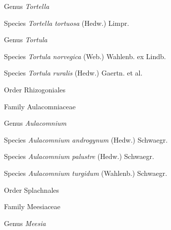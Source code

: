 \documentclass[9pt, article]{memoir}
\begin{document}
\begin{multicols}{2}
\vspace{6pt}\noindent\hspace{30pt}Genus \textit{Tortella}


\vspace{6pt}\noindent\hspace{36pt}Species \textit{Tortella tortuosa} (Hedw.) Limpr.


\vspace{6pt}\noindent\hspace{30pt}Genus \textit{Tortula}


\vspace{6pt}\noindent\hspace{36pt}Species \textit{Tortula norvegica} (Web.) Wahlenb. ex Lindb.


\vspace{6pt}\noindent\hspace{36pt}Species \textit{Tortula ruralis} (Hedw.) Gaertn. et al.


\vspace{6pt}\noindent\hspace{18pt}Order Rhizogoniales


\vspace{6pt}\noindent\hspace{24pt}Family Aulacomniaceae


\vspace{6pt}\noindent\hspace{30pt}Genus \textit{Aulacomnium}


\vspace{6pt}\noindent\hspace{36pt}Species \textit{Aulacomnium androgynum} (Hedw.) Schwaegr.


\vspace{6pt}\noindent\hspace{36pt}Species \textit{Aulacomnium palustre} (Hedw.) Schwaegr.


\vspace{6pt}\noindent\hspace{36pt}Species \textit{Aulacomnium turgidum} (Wahlenb.) Schwaegr.


\vspace{6pt}\noindent\hspace{18pt}Order Splachnales


\vspace{6pt}\noindent\hspace{24pt}Family Meesiaceae


\vspace{6pt}\noindent\hspace{30pt}Genus \textit{Meesia}



\end{multicols}
\end{document}
